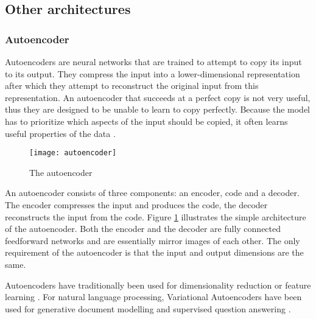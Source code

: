 \subsection{Other architectures} \label{Other architectures}
\subsubsection{Autoencoder}\label{Autoencoder}
Autoencoders are neural networks that are trained to attempt to copy its input to its output.
They compress the input into a lower-dimensional representation after which they attempt to reconstruct the original input from this representation.
An autoencoder that succeeds at a perfect copy is not very useful, thus they are designed to be unable to learn to copy perfectly.
Because the model has to prioritize which aspects of the input should be copied, it often learns useful properties of the data \cite{goodfellow2016}.


\begin{figure}[t]
\texttt{[image: autoencoder]}
\centering
\caption{The autoencoder}
\label{fig:autoencoder}
\end{figure}

An autoencoder consists of three components: an encoder, code and a decoder.
The encoder compresses the input and produces the code, the decoder reconstructs the input from the code.
Figure \ref{fig:autoencoder} illustrates the simple architecture of the autoencoder.
Both the encoder and the decoder are fully connected feedforward networks and are essentially mirror images of each other.
The only requirement of the autoencoder is that the input and output dimensions are the same.

Autoencoders have traditionally been used for dimensionality reduction or feature learning \cite{goodfellow2016}.
For natural language processing, Variational Autoencoders \cite{kingma2014} have been used for generative document modelling and supervised question answering \cite{miao2016}.



